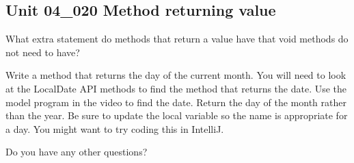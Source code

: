 \documentclass[letterpaper,12pt]{exam}
\newcommand{\unit}{Unit 04}
\begin{document}
\begin{questions}
\section*{\unit\_020 Method returning value} %
\begin{samepage}
	\question What extra statement do methods that return a value have that void methods do not need to have?
	\vspace{5mm}
\end{samepage}

\begin{samepage}
	\question Write a method that returns the day of the current month.  You will need to look at the LocalDate API methods to find the method that returns the date.  Use the model program in the video to find the date.  Return the day of the month rather than the year.  Be sure to update the local variable so the name is appropriate for a day.  You might want to try coding this in IntelliJ.  
	\vspace{55mm}
\end{samepage}


\begin{samepage}
	\question Do you have any other questions?
	\vspace{30mm}
\end{samepage}

\end{questions}
\end{document}
